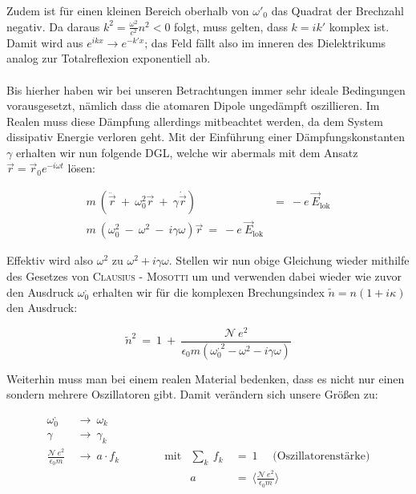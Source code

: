 Zudem ist für einen kleinen Bereich oberhalb von $\omega'_0$ das Quadrat der Brechzahl negativ. Da daraus $k^2 = \frac{\omega^2}{c^2} n^2 < 0$ folgt, muss gelten, dass $k=ik'$ komplex ist. Damit wird aus $e^{ikx} \rightarrow e^{-k'x}$; das Feld fällt also im inneren des Dielektrikums analog zur Totalreflexion exponentiell ab.\\
\ \\
Bis hierher haben wir bei unseren Betrachtungen immer sehr ideale Bedingungen vorausgesetzt, nämlich dass die atomaren Dipole ungedämpft oszillieren. Im Realen muss diese Dämpfung allerdings mitbeachtet werden, da dem System dissipativ Energie verloren geht. Mit der Einführung einer Dämpfungskonstanten $\gamma$ erhalten wir nun folgende DGL, welche wir abermals mit dem Ansatz $\vec{r}= \vec{r}_0 e^{-i\omega t}$ lösen:

\begin{align*}
m \ \left(\ddot{\vec{r}} \ + \ \omega_0^2 \vec{r} \ + \ \gamma \dot{\vec{r}}\right)  \ &= \ -e \ \vec{E}_{\text{lok}}\\
m \ \left(\omega_0^2 \ - \ \omega^2 \ - \ i \gamma\omega\right)\vec{r} \ = \ -e \ \vec{E}_{\text{lok}}
\end{align*}

Effektiv wird  also $\omega^2$ zu $\omega^2 + i\gamma\omega$.
\newpage
Stellen wir nun obige Gleichung wieder mithilfe des Gesetzes von \textsc{Clausius - Mosotti} um und verwenden dabei wieder wie zuvor den Ausdruck $\omega^{,}_0$ erhalten wir für die komplexen Brechungsindex $\tilde{n}= n (1+i\kappa)$ den Ausdruck:

\begin{equation*}
\tilde{n}^2 \ = \ 1 \ + \ \frac{\mathcal{N} \ e^2}{\epsilon_0 m \left(\omega^{,2}_0 - \omega^2 - i \gamma\omega\right)}
\end{equation*}

Weiterhin muss man bei einem realen Material bedenken, dass es nicht nur einen sondern mehrere Oszillatoren gibt. Damit verändern sich unsere Größen zu:

\begin{align*}
\omega^{,}_0 \ &\rightarrow \ \omega_k\\
\gamma \ &\rightarrow \ \gamma_k\\
\frac{\mathcal{N} \ e^2}{\epsilon_0 m} \ &\rightarrow \ a \cdot f_k \qquad\qquad \text{mit}  &\sum_k \ f_k  \ &= \ 1 \quad \text{  (Oszillatorenstärke)}\\
& &a \ &= \ \Bigg\langle\frac{\mathcal{N}\ e^2}{\epsilon_0 m}\Bigg\rangle
\end{align*}

